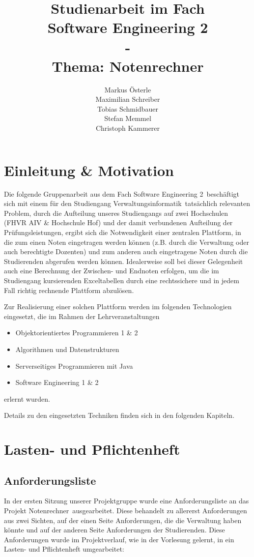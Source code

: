 \documentclass[12pt,a4paper,parskip]{scrreprt}
\author{Markus Österle \\ Maximilian Schreiber \\ Tobias Schmidbauer \\ Stefan Memmel \\ Christoph Kammerer}
\title{Studienarbeit im Fach \\ \glqq Software Engineering 2\grqq \\ - \\ Thema: Notenrechner}
\date{}
\begin{document}
\maketitle
\tableofcontents
\chapter{Einleitung \& Motivation}
Die folgende Gruppenarbeit aus dem Fach \glqq Software Engineering 2\grqq\ beschäftigt sich mit einem für den Studiengang \glqq Verwaltungsinformatik\grqq\ tatsächlich relevanten Problem, durch die Aufteilung unseres Studiengangs auf zwei Hochschulen (FHVR AIV \& Hochschule Hof) und der damit verbundenen Aufteilung der Prüfungsleistungen, ergibt sich die Notwendigkeit einer zentralen Plattform, in die zum einen Noten eingetragen werden können (z.B. durch die Verwaltung oder auch berechtigte Dozenten) und zum anderen auch eingetragene Noten durch die Studierenden abgerufen werden können. Idealerweise soll bei dieser Gelegenheit auch eine Berechnung der Zwischen- und Endnoten erfolgen, um die im Studiengang kursierenden Exceltabellen durch eine rechtssichere und in jedem Fall richtig rechnende Plattform abzulösen.

Zur Realisierung einer solchen Plattform werden im folgenden Technologien eingesetzt, die im Rahmen der Lehrveranstaltungen 
\begin{itemize}
\item Objektorientiertes Programmieren 1 \& 2
\item Algorithmen und Datenstrukturen
\item Serverseitiges Programmieren mit Java
\item Software Engineering 1 \& 2
\end{itemize}
erlernt wurden. 

Details zu den eingesetzten Techniken finden sich in den folgenden Kapiteln.
\chapter{Lasten- und Pflichtenheft}
\section{Anforderungsliste}
In der ersten Sitzung unserer Projektgruppe wurde eine Anforderungsliste an das Projekt \glqq Notenrechner\grqq\ ausgearbeitet. Diese behandelt zu allererst Anforderungen aus zwei Sichten, auf der einen Seite Anforderungen, die die Verwaltung haben könnte und auf der anderen Seite Anforderungen der Studierenden. Diese Anforderungen wurde im Projektverlauf, wie in der Vorlesung gelernt, in ein Lasten- und Pflichtenheft umgearbeitet:
\end{document}
